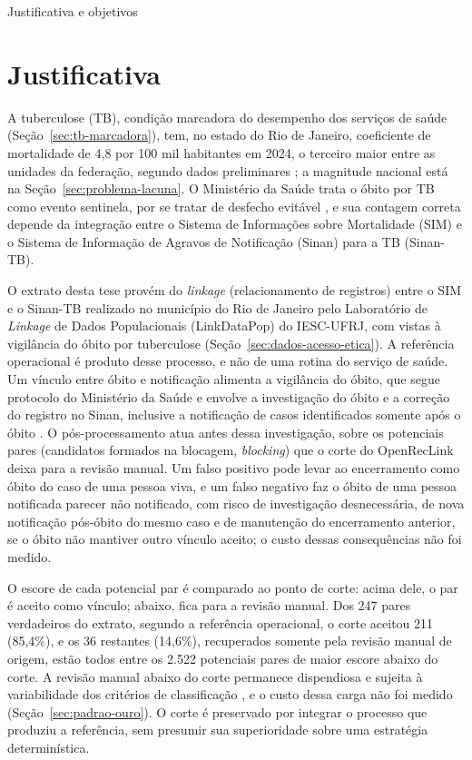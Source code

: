 \begin{chapter}{Justificativa e objetivos}\label{cap:justificativa}\label{cap:objetivos}

\section{Justificativa}\label{sec:justificativas-especificas}

A tuberculose (TB), condição marcadora do desempenho dos serviços de saúde (Seção~\ref{sec:tb-marcadora}), tem, no estado do Rio de Janeiro, coeficiente de mortalidade de 4,8 por 100 mil habitantes em 2024, o terceiro maior entre as unidades da federação, segundo dados preliminares \cite{Brasil2026tb}; a magnitude nacional está na Seção~\ref{sec:problema-lacuna}. O Ministério da Saúde trata o óbito por TB como evento sentinela, por se tratar de desfecho evitável \cite{Brasil2026tb}, e sua contagem correta depende da integração entre o Sistema de Informações sobre Mortalidade (SIM) e o Sistema de Informação de Agravos de Notificação (Sinan) para a TB (Sinan-TB).

O extrato desta tese provém do \textit{linkage} (relacionamento de registros) entre o SIM e o Sinan-TB realizado no município do Rio de Janeiro pelo Laboratório de \textit{Linkage} de Dados Populacionais (LinkDataPop) do IESC-UFRJ, com vistas à vigilância do óbito por tuberculose \cite{Oliveira2026obitoTBpulmonar} (Seção~\ref{sec:dados-acesso-etica}). A referência operacional é produto desse processo, e não de uma rotina do serviço de saúde. Um vínculo entre óbito e notificação alimenta a vigilância do óbito, que segue protocolo do Ministério da Saúde \cite{MS2017ProtocoloObitoTB} e envolve a investigação do óbito e a correção do registro no Sinan, inclusive a notificação de casos identificados somente após o óbito \cite{Selig2010vigilancia, Bierrenbach2015vigilancia}. O pós-processamento atua antes dessa investigação, sobre os potenciais pares (candidatos formados na blocagem, \textit{blocking}) que o corte do OpenRecLink deixa para a revisão manual. Um falso positivo pode levar ao encerramento como óbito do caso de uma pessoa viva, e um falso negativo faz o óbito de uma pessoa notificada parecer não notificado, com risco de investigação desnecessária, de nova notificação pós-óbito do mesmo caso e de manutenção do encerramento anterior, se o óbito não mantiver outro vínculo aceito; o custo dessas consequências não foi medido.

O escore de cada potencial par é comparado ao ponto de corte: acima dele, o par é aceito como vínculo; abaixo, fica para a revisão manual. Dos 247 pares verdadeiros do extrato, segundo a referência operacional, o corte aceitou 211 (85,4\%), e os 36 restantes (14,6\%), recuperados somente pela revisão manual de origem, estão todos entre os 2.522 potenciais pares de maior escore abaixo do corte. A revisão manual abaixo do corte permanece dispendiosa e sujeita à variabilidade dos critérios de classificação \cite{Christen2012book}, e o custo dessa carga não foi medido (Seção~\ref{sec:padrao-ouro}). O corte é preservado por integrar o processo que produziu a referência, sem presumir sua superioridade sobre uma estratégia determinística.


\end{chapter}
